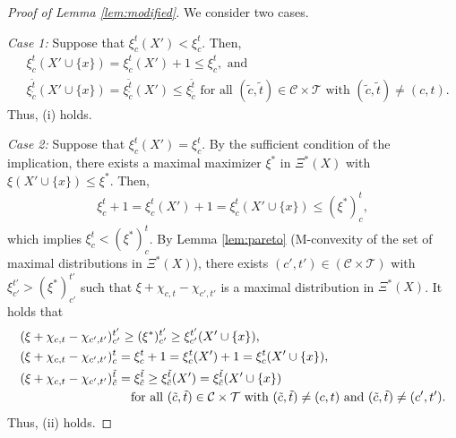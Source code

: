 \documentclass[12pt]{amsart}
\theoremstyle{remark}
\begin{document}
\begin{proof}[Proof of Lemma \ref{lem:modified}]\renewcommand{\qedsymbol}{$\blacksquare$}
We consider two cases.

\smallskip
\noindent
\emph{Case 1:}
Suppose that $\xi^{t}_{c}(X')<\xi^{t}_{c}$. Then,
\begin{align*}
&\xi^{t}_{c}(X'\cup \{x\})=\xi^{t}_{c}(X')+1\leq \xi^{t}_{c}, \text{ and } \\
&\xi^{\tilde t}_{\tilde c}(X'\cup \{x\})=\xi^{\tilde t}_{\tilde c}(X')\leq \xi^{\tilde t}_{\tilde c} \text{ for all } (\tilde c, \tilde t)\in \mathcal{C}\times \mathcal{T} \text{ with } (\tilde c, \tilde t)\neq (c,t).
\end{align*}
Thus, (i) holds.

\smallskip
\noindent
\emph{Case 2:}
Suppose that $\xi^{t}_{c}(X')=\xi^{t}_{c}$. By the sufficient condition of the implication, there exists a maximal maximizer $\xi^*$ in $\Xi^{*}(X)$ with $\xi(X'\cup \{x\})\leq \xi^*$. Then,
\begin{align*}
\xi^{t}_{c}+1=\xi^{t}_{c}(X')+1=\xi^{t}_{c}(X'\cup \{x\})\leq (\xi^*)^{t}_{c},
\end{align*}
which implies $\xi^{t}_{c}<(\xi^*)^{t}_{c}$.
By Lemma \ref{lem:pareto} (M-convexity of the set of maximal distributions in $\Xi^*(X)$), there exists $(c',t') \in (\mathcal{C}\times \mathcal{T})$ with $\xi^{t'}_{c'}>(\xi^*)^{t'}_{c'}$ such that $\xi+\chi_{c,t}-\chi_{c',t'}$ is a maximal distribution in $\Xi^*(X)$.
It holds that
\begin{align*}
&(\xi+\chi_{c,t}-\chi_{c',t'})^{t'}_{c'}\geq (\xi^*)^{t'}_{c'} \geq \xi^{t'}_{c'}(X'\cup \{x\}), \\
&(\xi+\chi_{c,t}-\chi_{c',t'})^{t}_{c}=\xi^{t}_{c}+1=\xi^{t}_{c}(X')+1=\xi^{t}_{c}(X'\cup \{x\}), \\
&(\xi+\chi_{c,t}-\chi_{c',t'})^{\tilde t}_{\tilde c}=\xi^{\tilde t}_{\tilde c} \geq \xi^{\tilde t}_{\tilde c}(X')=\xi^{\tilde t}_{\tilde c}(X'\cup \{x\}) \\
&\hspace{30mm}\text{ for all } (\tilde c, \tilde t)\in \mathcal{C}\times \mathcal{T} \text{ with } (\tilde c, \tilde t) \neq (c,t) \text{ and } (\tilde c, \tilde t)\neq (c',t').
\end{align*}
Thus, (ii) holds.
\end{proof}
\end{document}
